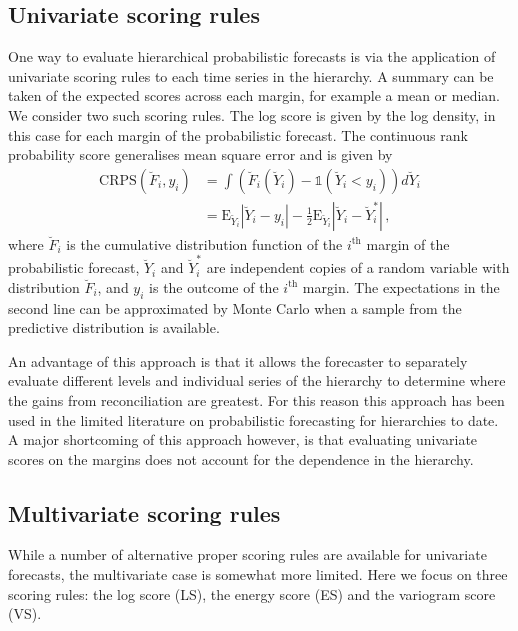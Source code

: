 \documentclass[12pt]{article}
\def\E{\text{E}}
\theoremstyle{definition}
\begin{document}
\subsection{Univariate scoring rules}

One way to evaluate hierarchical probabilistic forecasts is via the application of univariate scoring rules to each time series in the hierarchy. A summary can be taken of the expected scores across each margin, for example a mean or median. We consider two such scoring rules. The log score is given by the log density, in this case for each margin of the probabilistic forecast. The continuous rank probability score generalises mean square error and is given by
\begin{align} \label{eq:CRPS}
\text{CRPS}(\breve{F}_i,y_{i}) &=\int \left(\breve{F}_i(\breve{Y}_i)-\mathbb{1}(\breve{Y}_i<y_{i})\right)d\breve{Y}_i\\ &=\E_{\breve{Y}_i}|\breve{Y}_{i}-y_{i}| - \frac{1}{2}\E_{\breve{Y}_i}|\breve{Y}_{i}-\breve{Y}^*_{i}|\,,
\end{align}
where $\breve{F}_i$ is the cumulative distribution function of the $i^{\text{th}}$ margin of the probabilistic forecast, $\breve{Y}_i$ and $\breve{Y}^*_{i}$ are independent copies of a random variable with distribution $\breve{F}_i$, and $y_i$ is the outcome of the $i^{\text{th}}$ margin. The expectations in the second line can be approximated by Monte Carlo when a sample from the predictive distribution is available.

An advantage of this approach is that it allows the forecaster to separately evaluate different levels and individual series of the hierarchy to determine where the gains from reconciliation are greatest. For this reason this approach has been used in the limited literature on probabilistic forecasting for hierarchies \citep{BenTaieb2017, JeoEtAl2019} to date. A major shortcoming of this approach however, is that evaluating univariate scores on the margins does not account for the dependence in the hierarchy.

\subsection{Multivariate scoring rules}

While a number of alternative proper scoring rules are available for univariate forecasts, the multivariate case is somewhat more limited. Here we focus on three scoring rules: the log score (LS), the energy score (ES) and the variogram score (VS).
\end{document}
